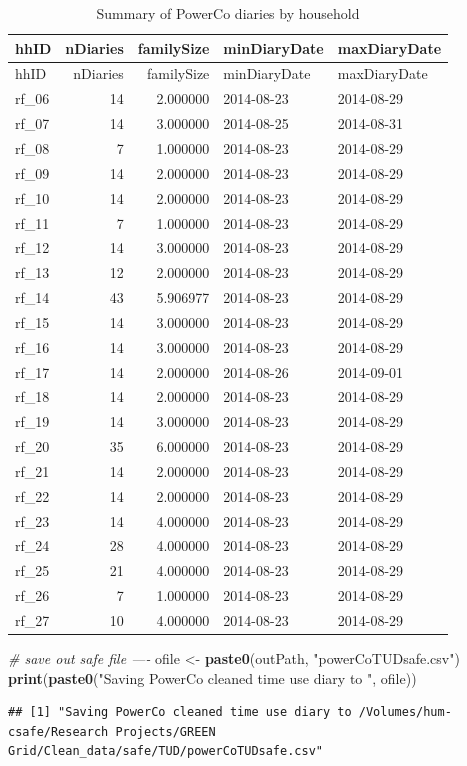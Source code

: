 \documentclass[]{article}
\newenvironment{Shaded}{\begin{snugshade}}{\end{snugshade}}
\newcommand{\KeywordTok}[1]{\textcolor[rgb]{0.13,0.29,0.53}{\textbf{#1}}}
\newcommand{\StringTok}[1]{\textcolor[rgb]{0.31,0.60,0.02}{#1}}
\newcommand{\CommentTok}[1]{\textcolor[rgb]{0.56,0.35,0.01}{\textit{#1}}}
\newcommand{\NormalTok}[1]{#1}
\begin{document}
\begin{longtable}[]{@{}lrrll@{}}
\caption{Summary of PowerCo diaries by household}\tabularnewline
\toprule
hhID & nDiaries & familySize & minDiaryDate &
maxDiaryDate\tabularnewline
\midrule
\endfirsthead
\toprule
hhID & nDiaries & familySize & minDiaryDate &
maxDiaryDate\tabularnewline
\midrule
\endhead
rf\_06 & 14 & 2.000000 & 2014-08-23 & 2014-08-29\tabularnewline
rf\_07 & 14 & 3.000000 & 2014-08-25 & 2014-08-31\tabularnewline
rf\_08 & 7 & 1.000000 & 2014-08-23 & 2014-08-29\tabularnewline
rf\_09 & 14 & 2.000000 & 2014-08-23 & 2014-08-29\tabularnewline
rf\_10 & 14 & 2.000000 & 2014-08-23 & 2014-08-29\tabularnewline
rf\_11 & 7 & 1.000000 & 2014-08-23 & 2014-08-29\tabularnewline
rf\_12 & 14 & 3.000000 & 2014-08-23 & 2014-08-29\tabularnewline
rf\_13 & 12 & 2.000000 & 2014-08-23 & 2014-08-29\tabularnewline
rf\_14 & 43 & 5.906977 & 2014-08-23 & 2014-08-29\tabularnewline
rf\_15 & 14 & 3.000000 & 2014-08-23 & 2014-08-29\tabularnewline
rf\_16 & 14 & 3.000000 & 2014-08-23 & 2014-08-29\tabularnewline
rf\_17 & 14 & 2.000000 & 2014-08-26 & 2014-09-01\tabularnewline
rf\_18 & 14 & 2.000000 & 2014-08-23 & 2014-08-29\tabularnewline
rf\_19 & 14 & 3.000000 & 2014-08-23 & 2014-08-29\tabularnewline
rf\_20 & 35 & 6.000000 & 2014-08-23 & 2014-08-29\tabularnewline
rf\_21 & 14 & 2.000000 & 2014-08-23 & 2014-08-29\tabularnewline
rf\_22 & 14 & 2.000000 & 2014-08-23 & 2014-08-29\tabularnewline
rf\_23 & 14 & 4.000000 & 2014-08-23 & 2014-08-29\tabularnewline
rf\_24 & 28 & 4.000000 & 2014-08-23 & 2014-08-29\tabularnewline
rf\_25 & 21 & 4.000000 & 2014-08-23 & 2014-08-29\tabularnewline
rf\_26 & 7 & 1.000000 & 2014-08-23 & 2014-08-29\tabularnewline
rf\_27 & 10 & 4.000000 & 2014-08-23 & 2014-08-29\tabularnewline
\bottomrule
\end{longtable}

\begin{Shaded}
\begin{Highlighting}[]
\CommentTok{# save out safe file ----}
\NormalTok{ofile <-}\StringTok{ }\KeywordTok{paste0}\NormalTok{(outPath, }\StringTok{"powerCoTUDsafe.csv"}\NormalTok{)}
\KeywordTok{print}\NormalTok{(}\KeywordTok{paste0}\NormalTok{(}\StringTok{"Saving PowerCo cleaned time use diary to "}\NormalTok{, ofile))}
\end{Highlighting}
\end{Shaded}

\begin{verbatim}
## [1] "Saving PowerCo cleaned time use diary to /Volumes/hum-csafe/Research Projects/GREEN Grid/Clean_data/safe/TUD/powerCoTUDsafe.csv"
\end{verbatim}
\end{document}
